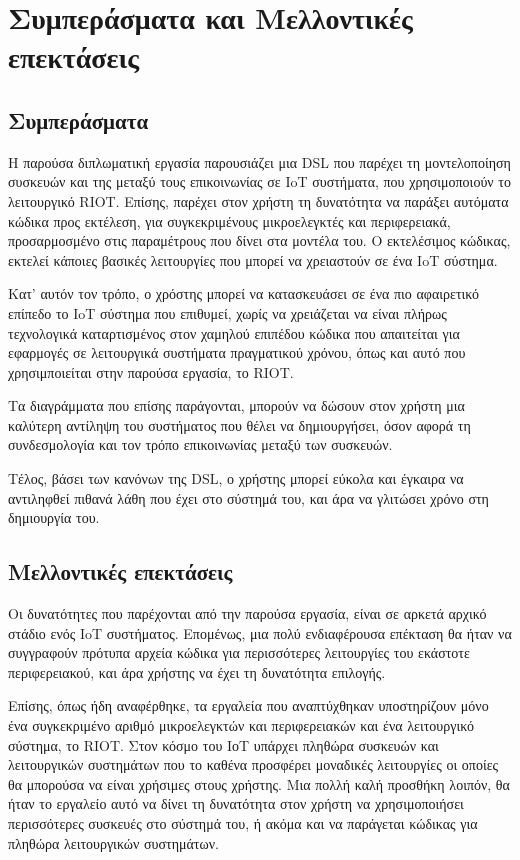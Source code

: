 \chapter{Συμπεράσματα και Μελλοντικές επεκτάσεις}
\label{chapter:conclusions}

\section{Συμπεράσματα}

Η παρούσα διπλωματική εργασία παρουσιάζει μια DSL που παρέχει τη μοντελοποίηση συσκευών και της μεταξύ τους επικοινωνίας σε IoT συστήματα, που χρησιμοποιούν το λειτουργικό RIOT. Επίσης, παρέχει στον χρήστη τη δυνατότητα να παράξει αυτόματα κώδικα προς εκτέλεση, για συγκεκριμένους μικροελεγκτές και περιφερειακά, προσαρμοσμένο στις παραμέτρους που δίνει στα μοντέλα του. Ο εκτελέσιμος κώδικας, εκτελεί κάποιες βασικές λειτουργίες που μπορεί να χρειαστούν σε ένα IoT σύστημα.

Κατ' αυτόν τον τρόπο, ο χρόστης μπορεί να κατασκευάσει σε ένα πιο αφαιρετικό επίπεδο το IoT σύστημα που επιθυμεί, χωρίς να χρειάζεται να είναι πλήρως τεχνολογικά καταρτισμένος στον χαμηλού επιπέδου κώδικα που απαιτείται για εφαρμογές σε λειτουργικά συστήματα πραγματικού χρόνου, όπως και αυτό που χρησιμποιείται στην παρούσα εργασία, το RIOT.

Τα διαγράμματα που επίσης παράγονται, μπορούν να δώσουν στον χρήστη μια καλύτερη αντίληψη του συστήματος που θέλει να δημιουργήσει, όσον αφορά τη συνδεσμολογία και τον τρόπο επικοινωνίας μεταξύ των συσκευών.

Τέλος, βάσει των κανόνων της DSL, ο χρήστης μπορεί εύκολα και έγκαιρα να αντιληφθεί πιθανά λάθη που έχει στο σύστημά του, και άρα να γλιτώσει χρόνο στη δημιουργία του.

\section{Μελλοντικές επεκτάσεις}

Οι δυνατότητες που παρέχονται από την παρούσα εργασία, είναι σε αρκετά αρχικό στάδιο ενός IoT συστήματος. Επομένως, μια πολύ ενδιαφέρουσα επέκταση θα ήταν να συγγραφούν πρότυπα αρχεία κώδικα για περισσότερες λειτουργίες του εκάστοτε περιφερειακού, και άρα χρήστης να έχει τη δυνατότητα επιλογής.

Επίσης, όπως ήδη αναφέρθηκε, τα εργαλεία που αναπτύχθηκαν υποστηρίζουν μόνο ένα συγκεκριμένο αριθμό μικροελεγκτών και περιφερειακών και ένα λειτουργικό σύστημα, το RIOT. Στον κόσμο του ΙοΤ υπάρχει πληθώρα συσκευών και λειτουργικών συστημάτων που το καθένα προσφέρει μοναδικές λειτουργίες οι οποίες θα μπορούσα να είναι χρήσιμες στους χρήστης. Μια πολλή καλή προσθήκη λοιπόν, θα ήταν το εργαλείο αυτό να δίνει τη δυνατότητα στον χρήστη να χρησιμοποιήσει περισσότερες συσκευές στο σύστημά του, ή ακόμα και να παράγεται κώδικας για πληθώρα λειτουργικών συστημάτων.

